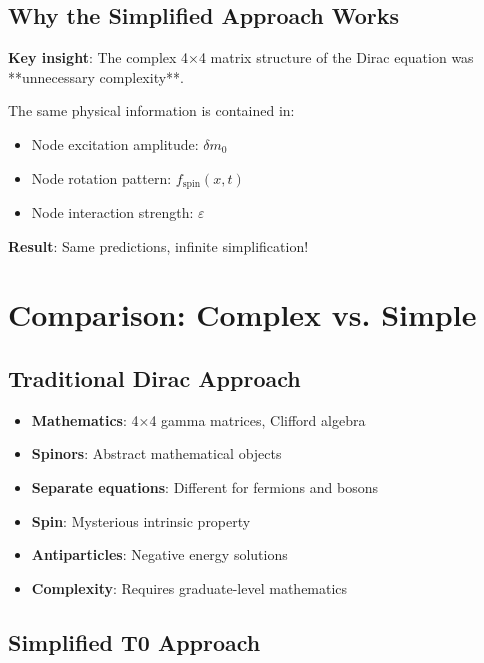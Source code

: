 \documentclass[12pt,a4paper]{article}
\newcommand{\deltam}{\delta m}
\theoremstyle{definition}
\theoremstyle{remark}
\begin{document}
	\subsection{Why the Simplified Approach Works}
	
	\begin{tcolorbox}[colback=green!5!white,colframe=green!75!black,title=Why Simplification Succeeds]
		\textbf{Key insight}: The complex 4×4 matrix structure of the Dirac equation was **unnecessary complexity**.
		
		The same physical information is contained in:
		\begin{itemize}
			\item Node excitation amplitude: $\deltam_0$
			\item Node rotation pattern: $f_{\text{spin}}(x,t)$
			\item Node interaction strength: $\varepsilon$
		\end{itemize}
		
		\textbf{Result}: Same predictions, infinite simplification!
	\end{tcolorbox}
	
	\section{Comparison: Complex vs. Simple}
	
	\subsection{Traditional Dirac Approach}
	
	\begin{itemize}
		\item \textbf{Mathematics}: 4×4 gamma matrices, Clifford algebra
		\item \textbf{Spinors}: Abstract mathematical objects
		\item \textbf{Separate equations}: Different for fermions and bosons  
		\item \textbf{Spin}: Mysterious intrinsic property
		\item \textbf{Antiparticles}: Negative energy solutions
		\item \textbf{Complexity}: Requires graduate-level mathematics
	\end{itemize}
	
	\subsection{Simplified T0 Approach}
	
\end{document}
